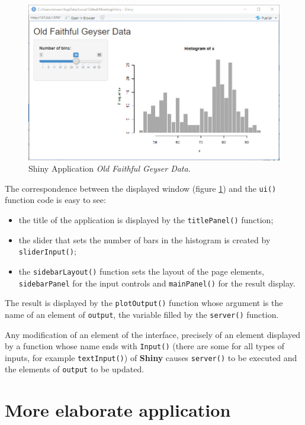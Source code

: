 \documentclass[
  12pt,
  american,
  a4paper,
  extrafontsizes,onecolumn,openright
  ]{memoir}
\providecommand{\tightlist}{%
  \setlength{\itemsep}{0pt}\setlength{\parskip}{0pt}}
\newlength{\rf}
\begin{document}
\begin{figure}

{\centering \includegraphics[width=0.8\linewidth]{images/shiny-geiser} 

}

\caption{Shiny Application \emph{Old Faithful Geyser Data}.}\label{fig:shiny-geiser}
\end{figure}

\normalsize

The correspondence between the displayed window (figure \ref{fig:shiny-geiser}) and the \texttt{ui()} function code is easy to see:

\begin{itemize}
\tightlist
\item
  the title of the application is displayed by the \texttt{titlePanel()} function;
\item
  the slider that sets the number of bars in the histogram is created by \texttt{sliderInput()};
\item
  the \texttt{sidebarLayout()} function sets the layout of the page elements, \texttt{sidebarPanel} for the input controls and \texttt{mainPanel()} for the result display.
\end{itemize}

The result is displayed by the \texttt{plotOutput()} function whose argument is the name of an element of \texttt{output}, the variable filled by the \texttt{server()} function.

Any modification of an element of the interface, precisely of an element displayed by a function whose name ends with \texttt{Input()} (there are some for all types of inputs, for example \texttt{textInput()}) of \textbf{Shiny} causes \texttt{server()} to be executed and the elements of \texttt{output} to be updated.

\hypertarget{more-elaborate-application}{%
\section{More elaborate application}\label{more-elaborate-application}}
\end{document}
